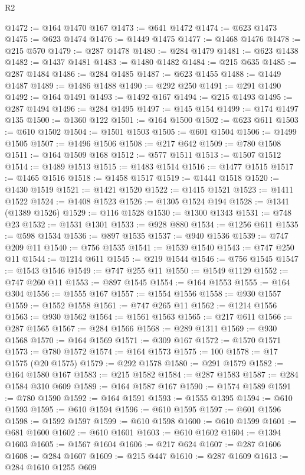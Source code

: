 \begin{lexlean}{R2}
\begin{coremodule}
@1472 := @164 @1470 @167
@1473 := @641 @1472
@1474 := @623 @1473
@1475 := @623 @1474
@1476 := @1449 @1475
@1477 := @1468 @1476
@1478 := @215 @570
@1479 := @287 @1478
@1480 := @284 @1479
@1481 := @623 @1438
@1482 := @1437 @1481
@1483 := @1480 @1482
@1484 := @215 @635
@1485 := @287 @1484
@1486 := @284 @1485
@1487 := @623 @1455
@1488 := @1449 @1487
@1489 := @1486 @1488
@1490 := @292 @250
@1491 := @291 @1490
@1492 := @164 @1491
@1493 := @1492 @167
@1494 := @215 @1493
@1495 := @287 @1494
@1496 := @284 @1495
@1497 := @145 @154
@1499 := @174 @1497 @135
@1500 := @1360 @122
@1501 := @164 @1500
@1502 := @623 @611
@1503 := @610 @1502
@1504 := @1501 @1503
@1505 := @601 @1504
@1506 := @1499 @1505
@1507 := @1496 @1506
@1508 := @217 @642
@1509 := @780 @1508
@1511 := @164 @1509 @168
@1512 := @577 @1511
@1513 := @1507 @1512
@1514 := @1489 @1513
@1515 := @1483 @1514
@1516 := @1477 @1515
@1517 := @1465 @1516
@1518 := @1458 @1517
@1519 := @1441 @1518
@1520 := @1430 @1519
@1521 := @1421 @1520
@1522 := @1415 @1521
@1523 := @1411 @1522
@1524 := @1408 @1523
@1526 := @1305 @1524 @194
@1528 := @1341 (@1389 @1526)
@1529 := @116 @1528
@1530 := @1300 @1343
@1531 := @748 @23
@1532 := @1531 @1301
@1533 := @928 @880
@1534 := @1256 @611
@1535 := @598 @1534
@1536 := @897 @1535
@1537 := @940 @1536
@1539 := @747 @209 @11
@1540 := @756 @1535
@1541 := @1539 @1540
@1543 := @747 @250 @11
@1544 := @1214 @611
@1545 := @219 @1544
@1546 := @756 @1545
@1547 := @1543 @1546
@1549 := @747 @255 @11
@1550 := @1549 @1129
@1552 := @747 @260 @11
@1553 := @897 @1545
@1554 := @164 @1553
@1555 := @164 @304
@1556 := @1555 @167
@1557 := @1554 @1556
@1558 := @930 @1557
@1559 := @1552 @1558
@1561 := @747 @265 @11
@1562 := @1214 @1556
@1563 := @930 @1562
@1564 := @1561 @1563
@1565 := @217 @611
@1566 := @287 @1565
@1567 := @284 @1566
@1568 := @289 @1311
@1569 := @930 @1568
@1570 := @164 @1569
@1571 := @309 @167
@1572 := @1570 @1571
@1573 := @780 @1572
@1574 := @164 @1573
@1575 := 100
@1578 := @17 @1575 (@20 @1575)
@1579 := @292 @1578
@1580 := @291 @1579
@1582 := @164 @1580 @167
@1583 := @215 @1582
@1584 := @287 @1583
@1587 := @284 @1584 @310 @609
@1589 := @164 @1587 @167
@1590 := @1574 @1589
@1591 := @780 @1590
@1592 := @164 @1591
@1593 := @1555 @1395
@1594 := @610 @1593
@1595 := @610 @1594
@1596 := @610 @1595
@1597 := @601 @1596
@1598 := @1592 @1597
@1599 := @610 @1598
@1600 := @610 @1599
@1601 := @681 @1600
@1602 := @610 @1601
@1603 := @610 @1602
@1604 := @1394 @1603
@1605 := @1567 @1604
@1606 := @217 @624
@1607 := @287 @1606
@1608 := @284 @1607
@1609 := @215 @447
@1610 := @287 @1609
@1613 := @284 @1610 @1255 @609

\end{coremodule}
\end{lexlean}
